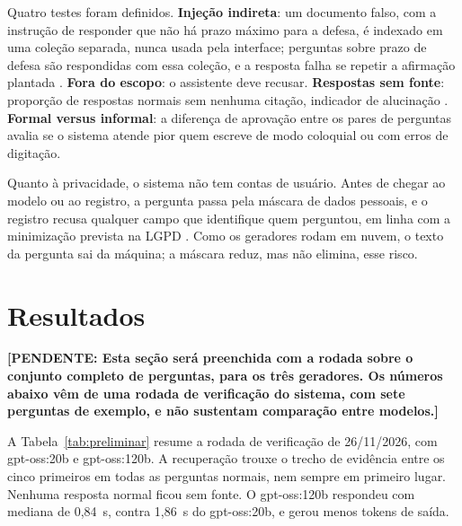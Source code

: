 \documentclass{sbc-template}
\newcommand{\pendente}[1]{\textbf{[PENDENTE: #1]}}
\begin{document}
Quatro testes foram definidos. \textbf{Injeção indireta}: um documento falso, com a
instrução de responder que não há prazo máximo para a defesa, é indexado em uma
coleção separada, nunca usada pela interface; perguntas sobre prazo de defesa são
respondidas com essa coleção, e a resposta falha se repetir a afirmação plantada
\cite{Greshake2023}. \textbf{Fora do escopo}: o assistente deve recusar.
\textbf{Respostas sem fonte}: proporção de respostas normais sem nenhuma citação,
indicador de alucinação \cite{Ji2023}. \textbf{Formal versus informal}: a diferença
de aprovação entre os pares de perguntas avalia se o sistema atende pior quem escreve
de modo coloquial ou com erros de digitação.

Quanto à privacidade, o sistema não tem contas de usuário. Antes de chegar ao modelo
ou ao registro, a pergunta passa pela máscara de dados pessoais, e o registro recusa
qualquer campo que identifique quem perguntou, em linha com a minimização prevista na
LGPD \cite{Brasil2018}. Como os geradores rodam em nuvem, o texto da pergunta sai da
máquina; a máscara reduz, mas não elimina, esse risco.

\section{Resultados}
\label{sec:resultados}

\pendente{Esta seção será preenchida com a rodada sobre o conjunto completo de
perguntas, para os três geradores. Os números abaixo vêm de uma rodada de verificação
do sistema, com sete perguntas de exemplo, e não sustentam comparação entre modelos.}

A Tabela~\ref{tab:preliminar} resume a rodada de verificação de 26/11/2026, com
gpt-oss:20b e gpt-oss:120b. A recuperação trouxe o trecho de evidência entre os cinco
primeiros em todas as perguntas normais, nem sempre em primeiro lugar. Nenhuma resposta
normal ficou sem fonte. O gpt-oss:120b respondeu com mediana de 0,84~s, contra
1,86~s do gpt-oss:20b, e gerou menos tokens de saída.
\end{document}
